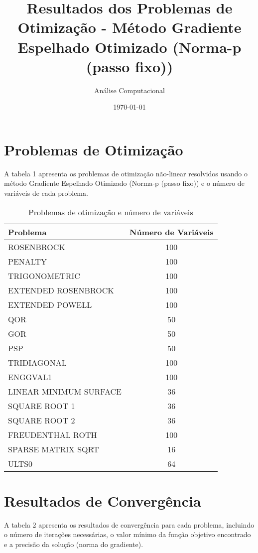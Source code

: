\documentclass[12pt]{article}
\title{Resultados dos Problemas de Otimização - Método Gradiente Espelhado Otimizado (Norma-p (passo fixo))}
\author{Análise Computacional}
\date{\today}
\begin{document}
\maketitle

\section{Problemas de Otimização}

A tabela 1 apresenta os problemas de otimização não-linear resolvidos usando o método Gradiente Espelhado Otimizado (Norma-p (passo fixo)) e o número de variáveis de cada problema.

\begin{table}[h!]
\centering
\caption{Problemas de otimização e número de variáveis}
\label{tab:problemas_variáveis}
\begin{tabular}{@{}|lc|@{}}
\toprule
\textbf{Problema} & \textbf{Número de Variáveis} \\
\midrule
ROSENBROCK & 100 \\
PENALTY & 100 \\
TRIGONOMETRIC & 100 \\
EXTENDED ROSENBROCK & 100 \\
EXTENDED POWELL & 100 \\
QOR & 50 \\
GOR & 50 \\
PSP & 50 \\
TRIDIAGONAL & 100 \\
ENGGVAL1 & 100 \\
LINEAR MINIMUM SURFACE & 36 \\
SQUARE ROOT 1 & 36 \\
SQUARE ROOT 2 & 36 \\
FREUDENTHAL ROTH & 100 \\
SPARSE MATRIX SQRT & 16 \\
ULTS0 & 64 \\
\bottomrule
\end{tabular}
\end{table}

\section{Resultados de Convergência}

A tabela 2 apresenta os resultados de convergência para cada problema, incluindo o número de iterações necessárias, o valor mínimo da função objetivo encontrado e a precisão da solução (norma do gradiente).
\end{document}
